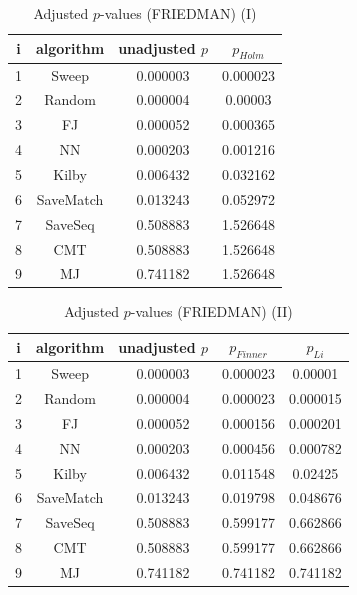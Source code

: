 \documentclass[a4paper,10pt]{article}
\begin{document}
\begin{landscape}
\begin{table}[!htp]
\centering\small
\begin{tabular}{cccc}
i&algorithm&unadjusted $p$&$p_{Holm}$\\
\hline1&Sweep&0.000003&0.000023\\2&Random&0.000004&0.00003\\3&FJ&0.000052&0.000365\\4&NN&0.000203&0.001216\\5&Kilby&0.006432&0.032162\\6&SaveMatch&0.013243&0.052972\\7&SaveSeq&0.508883&1.526648\\8&CMT&0.508883&1.526648\\9&MJ&0.741182&1.526648\\\hline
\end{tabular}
\caption{Adjusted $p$-values (FRIEDMAN) (I)}
\end{table}
\begin{table}[!htp]
\centering\small
\begin{tabular}{ccccc}
i&algorithm&unadjusted $p$&$p_{Finner}$&$p_{Li}$\\
\hline1&Sweep&0.000003&0.000023&0.00001\\2&Random&0.000004&0.000023&0.000015\\3&FJ&0.000052&0.000156&0.000201\\4&NN&0.000203&0.000456&0.000782\\5&Kilby&0.006432&0.011548&0.02425\\6&SaveMatch&0.013243&0.019798&0.048676\\7&SaveSeq&0.508883&0.599177&0.662866\\8&CMT&0.508883&0.599177&0.662866\\9&MJ&0.741182&0.741182&0.741182\\\hline
\end{tabular}
\caption{Adjusted $p$-values (FRIEDMAN) (II)}
\end{table}

\newpage
\end{landscape}
\end{document}
